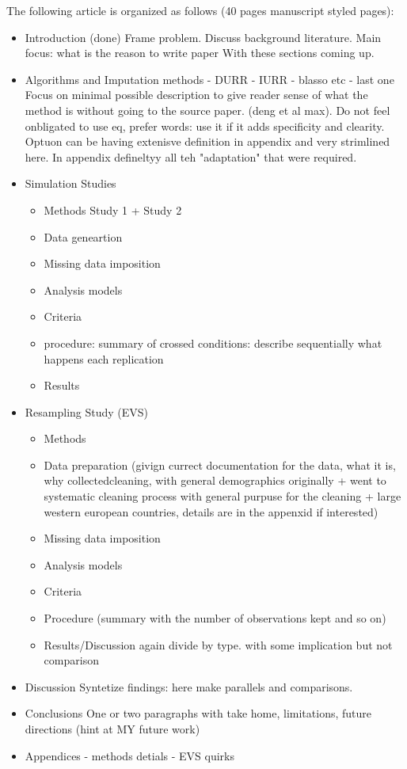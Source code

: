 The following article is organized as follows (40 pages manuscript styled pages):
\begin{itemize}
 \item Introduction (done)
	Frame problem. Discuss background literature.
	Main focus: what is the reason to write paper
	With these sections coming up.

 \item Algorithms and Imputation methods
	- DURR
	- IURR
	- blasso
	etc
	- last one
	Focus on minimal possible description to give reader sense of what the method is
	without going to the source paper. (deng et al max). Do not feel onbligated to use
	eq, prefer words: use it if it adds specificity and clearity.
	Optuon can be having extenisve definition in appendix and very strimlined 
	here. In appendix defineltyy all teh "adaptation" that were required.
 \item Simulation Studies

  \begin{itemize}
   \item Methods
	Study 1 + Study 2
   	    \item Data geneartion
	    \item Missing data imposition
	    \item Analysis models
	    \item Criteria
		\item procedure: summary of crossed conditions: describe sequentially 
			what happens each replication
   \item Results
  \end{itemize}

 \item Resampling Study (EVS)
  \begin{itemize}
	\item Methods
	   \item Data preparation (givign currect documentation for the data, what it is, 
		   why collectedcleaning, with general demographics originally + went to
		   systematic cleaning process with general purpuse for the cleaning + 
		   large western european countries, details are in the appenxid if 
		   interested)
	   \item Missing data imposition
	   \item Analysis models
	   \item Criteria
	   \item Procedure (summary with the number of observations kept and so on)
	\item Results/Discussion
		again divide by type. with some implication but not comparison
  \end{itemize}

 \item Discussion
	Syntetize findings: here make parallels and comparisons.

 \item Conclusions 
	 One or two paragraphs with take home, limitations, future directions (hint at 
	 MY future work)

 \item Appendices
 - methods detials
 - EVS quirks
\end{itemize}


